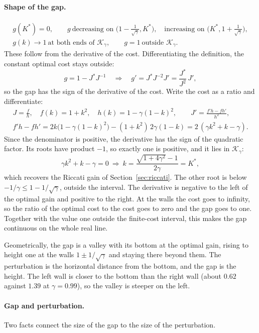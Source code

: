 \documentclass[11pt]{article}
\begin{document}
\paragraph{Shape of the gap.}
\begin{gather*}
  g(K^*) = 0, \qquad g \ \text{decreasing on } \big(1 - \tfrac{1}{\sqrt{\gamma}}, K^*\big), \quad
  \text{increasing on } \big(K^*, 1 + \tfrac{1}{\sqrt{\gamma}}\big), \\
  g(k) \to 1 \ \text{at both ends of } \mathcal{K}_\gamma, \qquad
  g = 1 \ \text{outside } \mathcal{K}_\gamma .
\end{gather*}
These follow from the derivative of the cost. Differentiating the definition, the constant optimal
cost stays outside:
\[
  g = 1 - J^* J^{-1} \quad\Longrightarrow\quad g' = J^* J^{-2} J' = \frac{J^*}{J^2}\, J' ,
\]
so the gap has the sign of the derivative of the cost. Write the cost as a ratio and differentiate:
\begin{gather*}
  J = \frac{f}{h}, \quad f(k) = 1 + k^2, \quad h(k) = 1 - \gamma (1 - k)^2, \qquad
  J' = \frac{f' h - f h'}{h^2}, \\
  f' h - f h' = 2k \big(1 - \gamma (1 - k)^2\big) - (1 + k^2)\, 2\gamma (1 - k)
  = 2\,(\gamma k^2 + k - \gamma).
\end{gather*}
Since the denominator is positive, the derivative has the sign of the quadratic factor. Its roots
have product $-1$, so exactly one is positive, and it lies in $\mathcal{K}_\gamma$:
\[
  \gamma k^2 + k - \gamma = 0 \ \Longrightarrow\ k = \frac{\sqrt{1 + 4\gamma^2} - 1}{2\gamma} = K^* ,
\]
which recovers the Riccati gain of Section~\ref{sec:riccati}. The other root is below
$-1/\gamma \le 1 - 1/\sqrt{\gamma}$, outside the interval. The derivative is negative to the left of
the optimal gain and positive to the right. At the walls the cost goes to infinity, so the ratio of
the optimal cost to the cost goes to zero and the gap goes to one. Together with the value one outside
the finite-cost interval, this makes the gap continuous on the whole real line.

Geometrically, the gap is a valley with its bottom at the optimal gain, rising to height one at the
walls $1 \pm 1/\sqrt{\gamma}$ and staying there beyond them. The perturbation is the horizontal
distance from the bottom, and the gap is the height. The left wall is closer to the bottom than the
right wall (about $0.62$ against $1.39$ at $\gamma = 0.99$), so the valley is steeper on the left.

\paragraph{Gap and perturbation.} Two facts connect the size of the gap to the size of the
perturbation.
\end{document}
